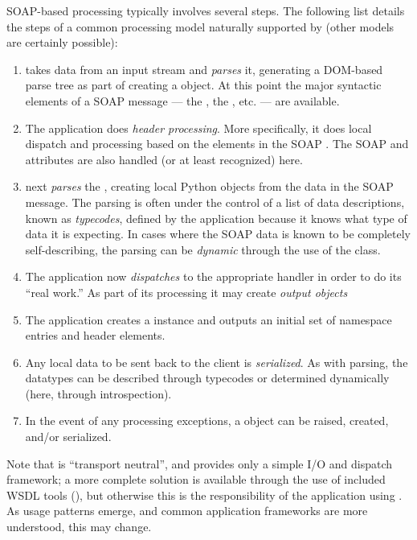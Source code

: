 SOAP-based processing typically involves several steps.
The following list details the steps of a common processing model naturally
supported by \ZSI{} (other models are certainly possible):
\begin{enumerate}
\item
    \ZSI{} takes data from an input stream and \emph{parses} it, generating
    a DOM-based parse tree as part of creating a  object.
    At this point the major syntactic elements of a SOAP message --- the
    , the , etc. --- are available.
\item
    The application does \emph{header processing}.
    More specifically, it does local dispatch and processing based on
    the elements in the SOAP .
    The SOAP  and  attributes are
    also handled (or at least recognized) here.
\item
    \ZSI{} next \emph{parses} the , creating local Python objects
    from the data in the SOAP message.
    The parsing is often under the control of a list of data descriptions,
    known as \emph{typecodes}, defined by the application because it knows
    what type of data it is expecting.
    In cases where the SOAP data is known to be completely self-describing,
    the parsing can be \emph{dynamic} through the use of the 
    class.
\item
    The application now \emph{dispatches} to the appropriate handler
    in order to do its ``real work.''
    As part of its processing it may create \emph{output objects}
\item
    The application creates a  instance and outputs
    an initial set of namespace entries and header elements.
\item
    Any local data to be sent back to the client is \emph{serialized}.
    As with  parsing, the datatypes can be described through
    typecodes or determined dynamically (here, through introspection).
\item
    In the event of any processing exceptions, a  object
    can be raised, created, and/or serialized.
\end{enumerate}

Note that \ZSI{} is ``transport neutral'', and provides only a simple
I/O and dispatch framework; a more complete solution is available through 
the use of included WSDL tools (), but otherwise this is
the responsibility of the application using \ZSI{}.  As usage patterns 
emerge, and common application frameworks are more understood, this may 
change.



